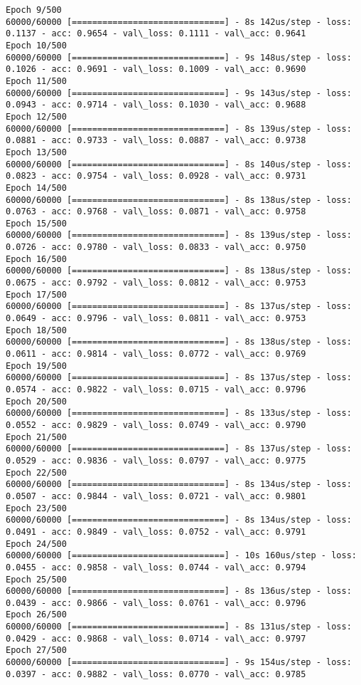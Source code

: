 \documentclass[11pt]{article}
\begin{document}
\begin{Verbatim}[commandchars=\\\{\}]
Epoch 9/500
60000/60000 [==============================] - 8s 142us/step - loss: 0.1137 - acc: 0.9654 - val\_loss: 0.1111 - val\_acc: 0.9641
Epoch 10/500
60000/60000 [==============================] - 9s 148us/step - loss: 0.1026 - acc: 0.9691 - val\_loss: 0.1009 - val\_acc: 0.9690
Epoch 11/500
60000/60000 [==============================] - 9s 143us/step - loss: 0.0943 - acc: 0.9714 - val\_loss: 0.1030 - val\_acc: 0.9688
Epoch 12/500
60000/60000 [==============================] - 8s 139us/step - loss: 0.0881 - acc: 0.9733 - val\_loss: 0.0887 - val\_acc: 0.9738
Epoch 13/500
60000/60000 [==============================] - 8s 140us/step - loss: 0.0823 - acc: 0.9754 - val\_loss: 0.0928 - val\_acc: 0.9731
Epoch 14/500
60000/60000 [==============================] - 8s 138us/step - loss: 0.0763 - acc: 0.9768 - val\_loss: 0.0871 - val\_acc: 0.9758
Epoch 15/500
60000/60000 [==============================] - 8s 139us/step - loss: 0.0726 - acc: 0.9780 - val\_loss: 0.0833 - val\_acc: 0.9750
Epoch 16/500
60000/60000 [==============================] - 8s 138us/step - loss: 0.0675 - acc: 0.9792 - val\_loss: 0.0812 - val\_acc: 0.9753
Epoch 17/500
60000/60000 [==============================] - 8s 137us/step - loss: 0.0649 - acc: 0.9796 - val\_loss: 0.0811 - val\_acc: 0.9753
Epoch 18/500
60000/60000 [==============================] - 8s 138us/step - loss: 0.0611 - acc: 0.9814 - val\_loss: 0.0772 - val\_acc: 0.9769
Epoch 19/500
60000/60000 [==============================] - 8s 137us/step - loss: 0.0574 - acc: 0.9822 - val\_loss: 0.0715 - val\_acc: 0.9796
Epoch 20/500
60000/60000 [==============================] - 8s 133us/step - loss: 0.0552 - acc: 0.9829 - val\_loss: 0.0749 - val\_acc: 0.9790
Epoch 21/500
60000/60000 [==============================] - 8s 137us/step - loss: 0.0529 - acc: 0.9836 - val\_loss: 0.0797 - val\_acc: 0.9775
Epoch 22/500
60000/60000 [==============================] - 8s 134us/step - loss: 0.0507 - acc: 0.9844 - val\_loss: 0.0721 - val\_acc: 0.9801
Epoch 23/500
60000/60000 [==============================] - 8s 134us/step - loss: 0.0491 - acc: 0.9849 - val\_loss: 0.0752 - val\_acc: 0.9791
Epoch 24/500
60000/60000 [==============================] - 10s 160us/step - loss: 0.0455 - acc: 0.9858 - val\_loss: 0.0744 - val\_acc: 0.9794
Epoch 25/500
60000/60000 [==============================] - 8s 136us/step - loss: 0.0439 - acc: 0.9866 - val\_loss: 0.0761 - val\_acc: 0.9796
Epoch 26/500
60000/60000 [==============================] - 8s 131us/step - loss: 0.0429 - acc: 0.9868 - val\_loss: 0.0714 - val\_acc: 0.9797
Epoch 27/500
60000/60000 [==============================] - 9s 154us/step - loss: 0.0397 - acc: 0.9882 - val\_loss: 0.0770 - val\_acc: 0.9785

\end{Verbatim}
\end{document}
